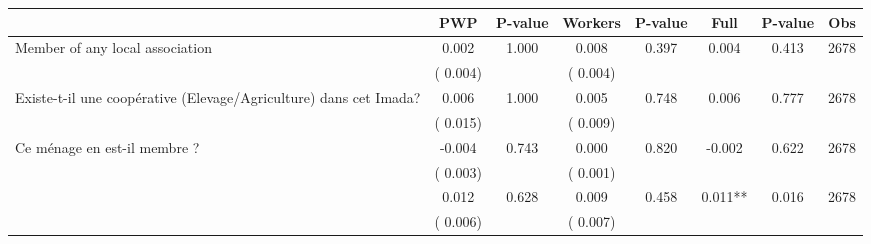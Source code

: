 
\begin{tabular}{l*{7}{c}}\hline&\multicolumn{1}{c}{PWP}&\multicolumn{1}{c}{P-value}&\multicolumn{1}{c}{Workers}&\multicolumn{1}{c}{P-value}&\multicolumn{1}{c}{Full}&\multicolumn{1}{c}{P-value}&\multicolumn{1}{c}{Obs} \\ \hline

 Member of any local association       &              0.002       &        1.000  &              0.008       &        0.397  &              0.004       &              0.413 &  2678 \\ 
                       &       (       0.004)             &                               &       (       0.004)                     &                               &                                               &                                &                      \\ 

 Existe-t-il une coopérative (Elevage/Agriculture) dans cet Imada?       &              0.006       &        1.000  &              0.005       &        0.748  &              0.006       &              0.777 &  2678 \\ 
                       &       (       0.015)             &                               &       (       0.009)                     &                               &                                               &                                &                      \\ 

 Ce ménage en est-il membre ?       &             -0.004       &        0.743  &              0.000       &        0.820  &             -0.002       &              0.622 &  2678 \\ 
                       &       (       0.003)             &                               &       (       0.001)                     &                               &                                               &                                &                      \\ 

        &              0.012       &        0.628  &              0.009       &        0.458  &              0.011**       &              0.016 &  2678 \\ 
                       &       (       0.006)             &                               &       (       0.007)                     &                               &                                               &                                &                      \\ 


\end{tabular}
